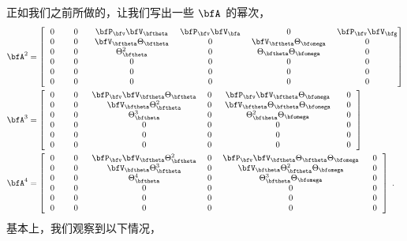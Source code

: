 正如我们之前所做的，让我们写出一些 $\bfA$ 的幂次，
%
%
\begin{align*}
\bfA^2 &= \begin{bmatrix}
  ~~0~~& ~~0~~& ~\bfP_\bfv \bfV_\bftheta~& \bfP_\bfv \bfV_\bfa&          0& \bfP_\bfv \bfV_\bfg\\
  0& 0& ~\bfV_\bftheta \Theta_\bftheta~&    0&      ~\bfV_\bftheta \Theta_\bfomega~&    0\\
  0& 0&  \Theta_\bftheta^2&     0& \Theta_\bftheta \Theta_\bfomega&     0\\
  0& 0&     0&     0&          0&     0\\
  0& 0&     0&     0&          0&     0\\
  0& 0&     0&     0&          0&     0
\end{bmatrix}\\
\bfA^3 &= \begin{bmatrix}
  ~~0~~& ~~0~~& \bfP_\bfv \bfV_\bftheta \Theta_\bftheta& ~0~&             ~\bfP_\bfv \bfV_\bftheta \Theta_\bfomega~& ~~0~~\\
  0& 0&  \bfV_\bftheta \Theta_\bftheta^2&    0&     \bfV_\bftheta \Theta_\bftheta \Theta_\bfomega&    0\\
  0& 0&     \Theta_\bftheta^3&     0& \Theta_\bftheta^2\Theta_\bfomega&     0\\
  0& 0&        0&     0&                    0&     0\\
  0& 0&        0&     0&                    0&     0\\
  0& 0&        0&     0&                    0&     0
\end{bmatrix}\\
\bfA^4 &= \begin{bmatrix}
  ~~0~~& ~~0~~& \bfP_\bfv \bfV_\bftheta \Theta_\bftheta^2 & ~0~&         \bfP_\bfv \bfV_\bftheta\Theta_\bftheta \Theta_\bfomega& ~~0~~\\
  0& 0&    \bfV_\bftheta \Theta_\bftheta^3&    0&  \bfV_\bftheta \Theta_\bftheta^2 \Theta_\bfomega&    0\\
  0& 0&       \Theta_\bftheta^4&     0& \Theta_\bftheta^3\Theta_\bfomega&     0\\
  0& 0&          0&     0&                              0&     0\\
  0& 0&          0&     0&                              0&     0\\
  0& 0&          0&     0&                              0&     0
\end{bmatrix}~.%
\end{align*}%
%
基本上，我们观察到以下情况，

